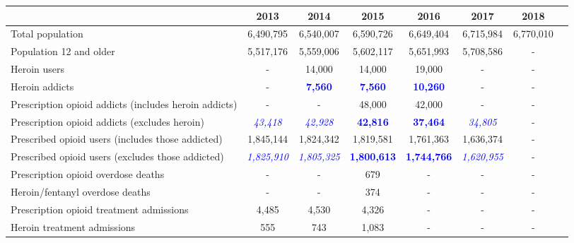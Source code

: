 \documentclass[12pt]{article}
\begin{document}
 \begin{sidewaystable} 
\begin{tabular}{|l|c|c|c|c|c|c|l}
\hline
 & \footnotesize{2013} & \footnotesize{2014} & \footnotesize{2015} & \footnotesize{2016} & \footnotesize{2017} & \footnotesize{2018}\\
\hline
\footnotesize
Total population & \footnotesize{6,490,795} & \footnotesize{6,540,007} & \footnotesize{6,590,726} & \footnotesize{6,649,404} & \footnotesize{6,715,984} & \footnotesize{6,770,010}\\
\footnotesize
Population 12 and older & \footnotesize{5,517,176} & \footnotesize{5,559,006} & \footnotesize{5,602,117} & \footnotesize{5,651,993} & \footnotesize{5,708,586} & -\\
\footnotesize
Heroin users& - &\footnotesize{14,000} & \footnotesize{14,000} & \footnotesize{19,000}  & - &-\\
\footnotesize
Heroin addicts & - &\footnotesize{\textcolor{blue}{\textbf{7,560}}} & \footnotesize{\textcolor{blue}{\textbf{7,560}}} & \footnotesize{\textcolor{blue}{\textbf{10,260}}}  & - &-\\
\footnotesize
Prescription opioid addicts (includes heroin addicts) & - &  - & \footnotesize{48,000}
& \footnotesize{42,000} & - &-\\
\footnotesize
Prescription opioid addicts (excludes heroin) & \footnotesize{\textit{\textcolor{blue}{43,418}}} & \footnotesize{\textit{\textcolor{blue}{42,928}}} & \footnotesize{\textcolor{blue}{\textbf{42,816}}
} & \footnotesize{\textcolor{blue}{\textbf{37,464}}} & \footnotesize{\textit{\textcolor{blue}{34,805}}} &-\\
\footnotesize
Prescribed opioid users (includes those addicted) & \footnotesize{1,845,144} &\footnotesize{1,824,342} & \footnotesize{1,819,581} & \footnotesize{1,761,363} &  \footnotesize{1,636,374} &-\\
\footnotesize
Prescribed opioid users (excludes those addicted)   & \footnotesize{\textit{\textcolor{blue}{1,825,910}}} &\footnotesize{\textit{\textcolor{blue}{1,805,325}
}} & \footnotesize{\textcolor{blue}{\textbf{1,800,613}}} & \footnotesize{\textcolor{blue}{\textbf{1,744,766}}} &  \footnotesize{\textit{\textcolor{blue}{1,620,955}
}} &-\\
\footnotesize
Prescription opioid overdose deaths & - & - & \footnotesize{679} & -  & - &-\\
\footnotesize
Heroin/fentanyl overdose deaths & - & - & \footnotesize{374} & -  & - &-\\
\footnotesize
Prescription opioid treatment admissions & \footnotesize{4,485} & \footnotesize{4,530} & \footnotesize{4,326} & -  & - &-\\
\footnotesize
Heroin treatment admissions & \footnotesize{555} & \footnotesize{743} & \footnotesize{1,083} & -  & - &-\\
\hline
\end{tabular} \\
\label{tab:template}


\end{sidewaystable}
\end{document}
